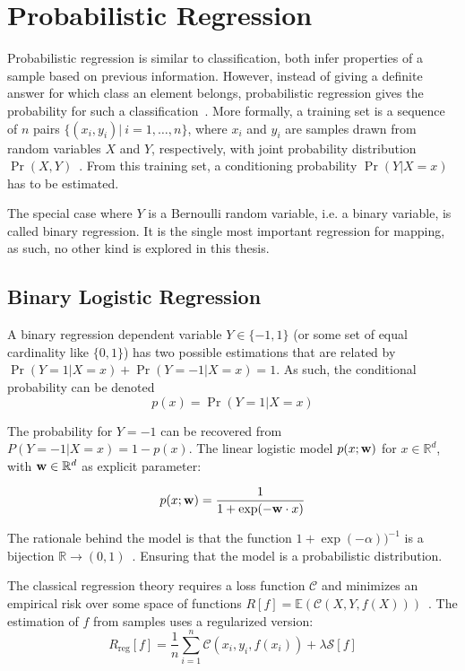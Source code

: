 
\section{Probabilistic Regression}

Probabilistic regression is similar to classification, both infer properties of
a sample based on previous information. However, instead of giving a definite
answer for which class an element belongs, probabilistic regression gives the
probability for such a classification~\cite{jaakkola1999probabilistic}. More
formally, a training set is a sequence of $n$ pairs
$\{(x_i,y_i)|~i=1,\ldots,n\}$, where $x_i$ and $y_i$ are samples drawn from
random variables $X$ and $Y$, respectively, with joint probability distribution
$\Pr(X,Y)$~\cite{friedman2001elements}. From this training set, a conditioning
probability $\Pr(Y|X=x)$ has to be estimated.

The special case where $Y$ is a Bernoulli random variable, i.e. a binary
variable, is called binary regression. It is the single most important
regression for mapping, as such, no other kind is explored in this thesis. 

\subsection{Binary Logistic Regression} 
\label{ss:blr}
A binary regression dependent variable $Y\in\{-1,1\}$
(or some set of equal cardinality like $\{0,1\}$) has two
possible estimations that are related by $\Pr(Y=1|X=x)+\Pr(Y=-1|X=x)=1$. As
such, the conditional probability can be denoted
\begin{equation*}
p(x) = \Pr(Y=1|X=x) 
\end{equation*}

The probability for $Y=-1$ can be recovered from $P(Y=-1|X=x)=1-p(x)$. The
linear logistic model $p(x;\mathrm{\mathbf{w}})$ for $x\in\mathbb{R}^d$, with
$\mathrm{\mathbf{w}}\in\mathbb{R}^d$ as explicit parameter:

\begin{equation}
\label{eq:std_linear_logistic}
p(x;\mathrm{\mathbf{w}}) = \frac{1}{1+\exp(-\mathrm{\mathbf{w}}\cdot x)}
\end{equation}

The rationale behind the model is that the function
$1+\exp(-\alpha))^{-1}$ is a bijection
$\mathbb{R}\to(0,1)$~\cite{friedman2001elements}. Ensuring that the model is a
probabilistic distribution.

The classical regression theory requires a loss function $\mathscr{C}$ and
minimizes an empirical risk over some space of functions
$R[f]=\mathbb{E}(\mathscr{C}(X,Y,f(X)))$~\cite{jaakkola1999probabilistic}. The
estimation of $f$ from samples uses a regularized version:
\begin{equation}
R_{\text{reg}}[f] =
\frac{1}{n}\sum_{i=1}^n\mathscr{C}(x_i,y_i,f(x_i))+\lambda\mathcal{S}[f]
\end{equation}

